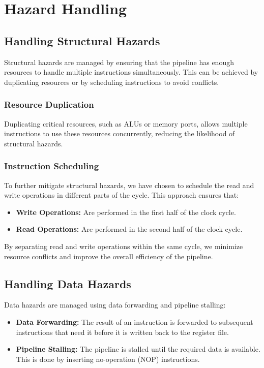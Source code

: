 \documentclass{report}
\begin{document}
\chapter{Hazard Handling}

\section*{Handling Structural Hazards}
Structural hazards are managed by ensuring that the pipeline has enough resources to handle multiple instructions simultaneously. This can be achieved by duplicating resources or by scheduling instructions to avoid conflicts.

\subsection*{Resource Duplication}
Duplicating critical resources, such as ALUs or memory ports, allows multiple instructions to use these resources concurrently, reducing the likelihood of structural hazards.

\subsection*{Instruction Scheduling}
To further mitigate structural hazards, we have chosen to schedule the read and write operations in different parts of the cycle. This approach ensures that:
\begin{itemize}
    \item \textbf{Write Operations:} Are performed in the first half of the clock cycle.
    \item \textbf{Read Operations:} Are performed in the second half of the clock cycle.
\end{itemize}
By separating read and write operations within the same cycle, we minimize resource conflicts and improve the overall efficiency of the pipeline.

\section*{Handling Data Hazards}
Data hazards are managed using data forwarding and pipeline stalling:
\begin{itemize}
    \item \textbf{Data Forwarding:} The result of an instruction is forwarded to subsequent instructions that need it before it is written back to the register file.
    \item \textbf{Pipeline Stalling:} The pipeline is stalled until the required data is available. This is done by inserting no-operation (NOP) instructions.
\end{itemize}
\end{document}
